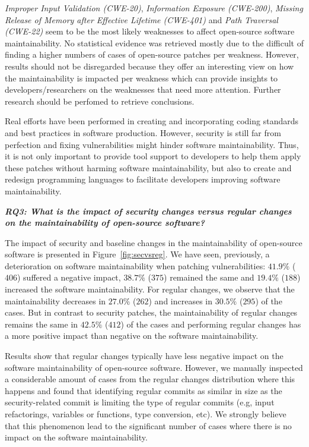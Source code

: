 \documentclass[10pt,conference]{IEEEtran}
\newcommand\Sof[1]{\nb{Sofia}{red}{#1}}
\begin{document}
\emph{Improper Input Validation (CWE-20)}, \emph{Information Exposure 
(CWE-200)}, \emph{Missing Release of Memory after Effective 
Lifetime (CWE-401)} and \emph{Path Traversal (CWE-22)} seem to be the most likely 
weaknesses to affect open-source software maintainability.
No statistical evidence was retrieved mostly due to the difficult
of finding a higher numbers of cases of open-source patches per weakness. However, 
results should not be disregarded because they offer an interesting view on how 
the maintainability is impacted per weakness which can provide insights to 
developers/researchers on the weaknesses that need more attention. Further
research should be perfomed to retrieve conclusions.

Real
efforts have been performed in creating and incorporating coding standards and best
practices in software production. However, security is still far from perfection
and fixing vulnerabilities might hinder software maintainability. Thus, it is
not only important to provide tool support to developers to help them apply these
patches without harming software maintainability, but also to create and redesign
programming languages to facilitate developers improving software maintainability.


\textit{\textbf{RQ3: What is the impact of security changes versus regular 
changes on the maintainability of open-source software?}}

The impact of security and baseline changes in the maintainability of
open-source software is presented in Figure~\ref{fig:secvsreg}.  
We have seen, previously, a deterioration on software maintainability 
when patching vulnerabilities: $41.9\%$ ($406$) suffered a 
negative impact, $38.7\%$ ($375$) remained the same and $19.4\%$ 
($188$) increased the software maintainability. For regular changes, 
we observe that the maintainability decreases in $27.0\%$ ($262$) 
and increases in $30.5\%$ ($295$) of the cases. But in contrast to 
security patches, the maintainability of regular changes remains the 
same in $42.5\%$ ($412$) of the cases and performing regular
changes has a more positive impact than negative on the software 
maintainability. 


Results show that regular changes typically have less negative impact
on the software maintainability of open-source software.
However, we manually inspected a considerable amount of cases from
the regular changes distribution where this happens and found that 
identifying regular commits as similar in size as the security-related 
commit is limiting the type of regular commits (e.g, input 
refactorings, variables or functions, type conversion, etc).  
We strongly believe that this phenomenon lead
to the significant number of cases where there is no impact
on the software maintainability.
\end{document}
